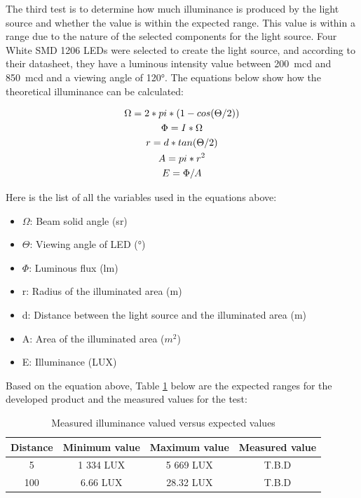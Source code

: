 The third test is to determine how much illuminance is produced by the light source and whether the value is within the expected range. This value is within a range due to the nature of the selected components for the light source. Four White SMD 1206 LEDs were selected to create the light source, and according to their datasheet, they have a luminous intensity value between 200~mcd and 850~mcd and a viewing angle of 120°. The equations below show how the theoretical illuminance can be calculated: \citep{TLH}

\begin{subequations}
    \centering
    \begin{gather}
        \Omega = 2*pi*(1-cos(\Theta/2)) \\
        \Phi = I*\Omega \\
        r = d*tan(\Theta/2) \\
        A = pi*r^2 \\
        E =  \Phi/A 
    \end{gather}
    
\end{subequations}

Here is the list of all the variables used in the equations above:

\begin{itemize}
    \item $\Omega$: Beam solid angle (sr)
    \item $\Theta$: Viewing angle of LED (°)
    \item $\Phi$: Luminous flux (lm)
    \item r: Radius of the illuminated area (m)
    \item d: Distance between the light source and the illuminated area (m)
    \item A: Area of the illuminated area ($m^2$)
    \item E: Illuminance (LUX)
\end{itemize}

Based on the equation above, Table \ref{tab:Illumance Values} below are the expected ranges for the developed product and the measured values for the test:

\begin{table}[h]
    \centering
    \caption{Measured illuminance valued versus expected values}
    \begin{tabular}{|c|c|c|c|}

    \hline
        Distance & Minimum value & Maximum value & Measured value \\
    \hline
        5 & 1 334 LUX & 5 669 LUX & T.B.D \\
    \hline
        100 & 6.66 LUX & 28.32 LUX & T.B.D \\
    \hline

    \end{tabular}
    \label{tab:Illumance Values}
\end{table}

